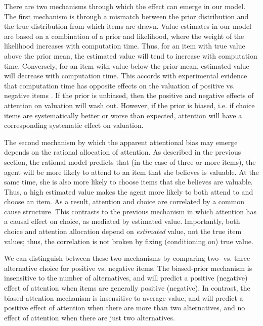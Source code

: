 \documentclass[12pt,a4paperpaper,]{article}
\begin{document}
There are two mechanisms through which the effect can emerge in our model. The first mechanism is through a mismatch between the prior distribution and the true distribution from which items are drawn. Value estimates in our model are based on a combination of a prior and likelihood, where the weight of the likelihood increases with computation time. Thus, for an item with true value above the prior mean, the estimated value will tend to increase with computation time. Conversely, for an item with value below the prior mean, estimated value will decrease with computation time. This accords with experimental evidence that computation time has opposite effects on the valuation of positive vs. negative items \citep{Armel2008}. If the prior is unbiased, then the positive and negative effects of attention on valuation will wash out. However, if the prior is biased, i.e. if choice items are systematically better or worse than expected, attention will have a corresponding systematic effect on valuation.

The second mechanism by which the apparent attentional bias may emerge depends on the rational allocation of attention. As described in the previous section, the rational model predicts that (in the case of three or more items), the agent will be more likely to attend to an item that she believes is valuable. At the same time, she is also more likely to choose items that she believes are valuable. Thus, a high estimated value makes the agent more likely to both attend to and choose an item. As a result, attention and choice are correlated by a common cause structure. This contrasts to the previous mechanism in which attention has a causal effect on choice, as mediated by estimated value. Importantly, both choice and attention allocation depend on \emph{estimated} value, not the true item values; thus, the correlation is not broken by fixing (conditioning on) true value.

We can distinguish between these two mechanisms by comparing two- vs. three-alternative choice for positive vs. negative items. The biased-prior mechanism is insensitive to the number of alternatives, and will predict a positive (negative) effect of attention when items are generally positive (negative). In contrast, the biased-attention mechanism is insensitive to average value, and will predict a positive effect of attention when there are more than two alternatives, and no effect of attention when there are just two alternatives.


\end{document}
